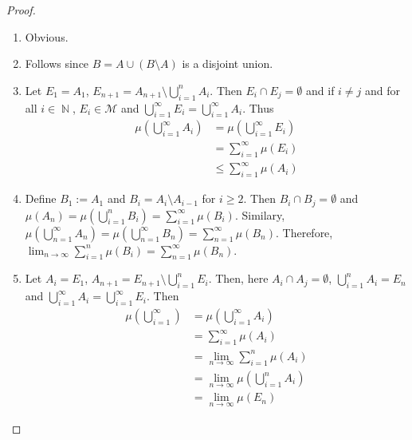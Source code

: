 \documentclass[11pt, a4paper]{memoir}
\DeclareMathOperator{\N}{{\mathbb{N}}}
\theoremstyle{change}
\theoremstyle{plain}
\theoremstyle{nonumberplain}
\newtheorem{proof}{Proof}
\begin{document}
\begin{proof}
    \begin{enumerate}
        \item Obvious.
        \item Follows since $B=A\cup(B\setminus A)$ is a disjoint union.
        \item Let $E_1=A_1$, $E_{n+1}=A_{n+1}\setminus\bigcup_{i=1}^n A_i$.
            Then $E_i\cap E_j=\emptyset$ and if $i\neq j$ and for all $i\in\N$, $E_i\in\mathcal{M}$ and $\bigcup_{i=1}^\infty E_i=\bigcup_{i=1}^\infty A_i$.
            Thus
            \begin{align*}
                \mu\left(\bigcup\limits_{i=1}^\infty A_i\right)&=\mu\left(\bigcup\limits_{i=1}^\infty E_i\right)\\
                                                               &= \sum\limits_{i=1}^\infty \mu(E_i)\\
                                                               &\leq \sum\limits_{i=1}^\infty\mu(A_i)
            \end{align*}
        \item Define $B_1:=A_1$ and $B_i=A_i\setminus A_{i-1}$ for $i\geq 2$.
            Then $B_i\cap B_j=\emptyset$ and $\mu(A_n)=\mu\left(\bigcup_{i=1}^n B_i\right)=\sum_{i=1}^\infty\mu(B_i)$.
            Similary, $\mu\left(\bigcup_{n=1}^\infty A_n\right)=\mu\left(\bigcup_{n=1}^\infty B_n\right)=\sum_{n=1}^\infty\mu(B_n)$.
            Therefore, $\lim_{n\to\infty}\sum_{i=1}^n \mu(B_i)=\sum_{n=1}^\infty \mu(B_n)$.
        \item Let $A_i=E_1$, $A_{n+1}=E_{n+1}\setminus\bigcup_{i=1}^n E_i$.
            Then, here $A_i\cap A_j=\emptyset$, $\bigcup_{i=1}^n A_i=E_n$ and $\bigcup_{i=1}^\infty A_i=\bigcup_{i=1}^\infty E_i$.
            Then
            \begin{align*}
                \mu\left(\bigcup\limits_{i=1}^\infty\right) &= \mu\left(\bigcup\limits_{i=1}^\infty A_i\right)\\
                                                            &= \sum\limits_{i=1}^\infty \mu(A_i)\\
                                                            &= \lim_{n\to\infty}\sum\limits_{i=1}^n \mu(A_i)\\
                                                            &= \lim_{n\to\infty} \mu\left(\bigcup\limits_{i=1}^n A_i\right)\\
                                                            &= \lim_{n\to\infty}\mu(E_n)

\end{align*}
\end{enumerate}
\end{proof}
\end{document}
